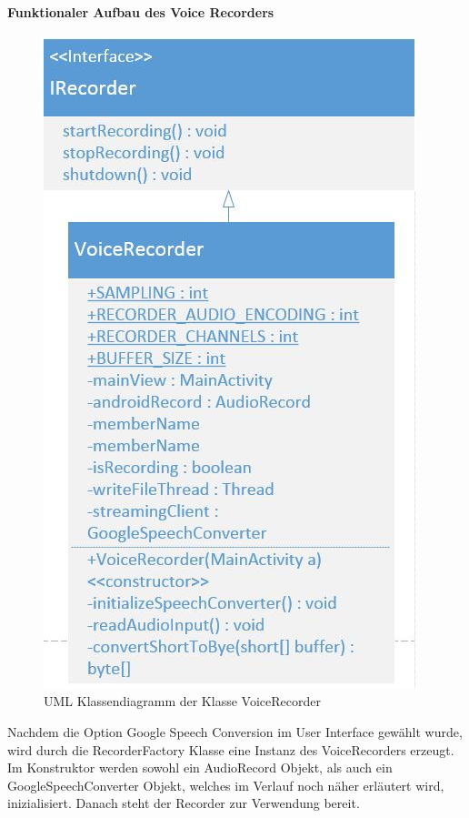 \paragraph{Funktionaler Aufbau des Voice Recorders}
\begin{figure}
	\includegraphics[width=\linewidth]{../images/VoiceRecorder.JPG}
	\caption{UML Klassendiagramm der Klasse VoiceRecorder}
	\label{fig:VoiceRecorder}
\end{figure}
Nachdem die Option Google Speech Conversion im User Interface gewählt wurde, wird durch die RecorderFactory Klasse eine Instanz des VoiceRecorders erzeugt. Im Konstruktor werden sowohl ein AudioRecord Objekt, als auch ein GoogleSpeechConverter Objekt, welches im Verlauf noch näher erläutert wird, inizialisiert. Danach steht der Recorder zur Verwendung bereit. \\
